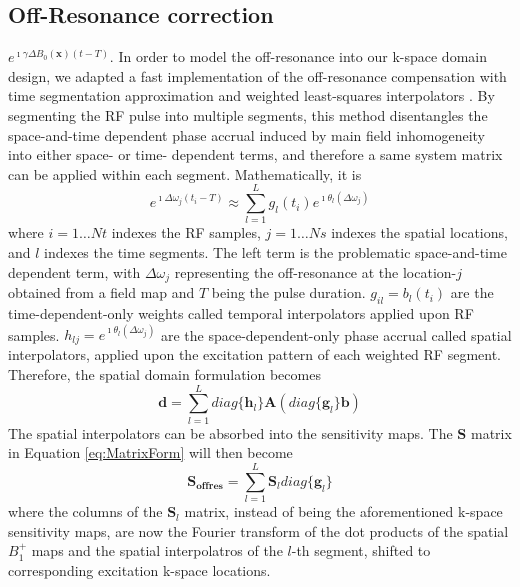 \subsection*{ Off-Resonance correction}
$e^{\imath \gamma \Delta B_0(\bm{x})(t-T)}$. 
In order to model the off-resonance into our k-space domain design, we adapted a fast implementation of the off-resonance compensation with time segmentation approximation and weighted least-squares interpolators \cite{fessler2005toeplitz}. 
By segmenting the RF pulse into multiple segments, this method disentangles the space-and-time dependent phase accrual induced by main field inhomogeneity into either space- or time- dependent terms, and therefore a same system matrix can be applied within each segment. Mathematically, it is
\begin{equation*}
e^{\imath \Delta\omega_j (t_i-T) }\approx\sum_{l=1}^{L} g_{l}(t_i) e^{\imath \theta_{l}(\Delta\omega_j)}
\end{equation*}
where $i=1\dots Nt$ indexes the RF samples, $j=1\dots Ns$ indexes the spatial locations, and $l$ indexes the time segments. The left term is the problematic space-and-time dependent term, with $\Delta\omega_j$ representing the off-resonance at the location-$j$ obtained from a field map and $T$ being the pulse duration. $g_{il}=b_{l}(t_i)$ are the time-dependent-only weights called temporal interpolators applied upon RF samples. $h_{lj}=e^{\imath \theta_{l}(\Delta\omega_j)}$ are the space-dependent-only phase accrual called spatial interpolators, applied upon the excitation pattern of each weighted RF segment. Therefore, the spatial domain formulation becomes
\begin{equation*}
\bm{d}=\sum_{l=1}^{L}diag\{\bm{h}_l\}\bm{A}(diag\{\bm{g}_l\}\bm{b})
\end{equation*}
The spatial interpolators can be absorbed into the sensitivity maps. The $\bm{S}$ matrix in Equation \ref{eq:MatrixForm} will then become 
\begin{equation*}
\bm{S_{offres}}=\sum_{l=1}^{L}\bm{S}_l diag\{\bm{g}_l\}
\end{equation*}
where the columns of the $\bm{S}_l$ matrix, instead of being the aforementioned k-space sensitivity maps, are now the Fourier transform of the dot products of the spatial $B_1^+$ maps and the spatial interpolatros of the $l$-th segment, shifted to corresponding excitation k-space locations. 
